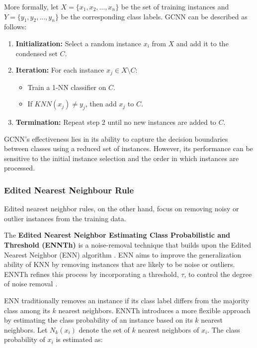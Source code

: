 More formally, let $X = \{x_1, x_2, ..., x_n\}$ be the set of training instances and $Y = \{y_1, y_2, ..., y_n\}$ be 
the corresponding class labels. GCNN can be described as follows:

\begin{enumerate}
    \item \textbf{Initialization:} Select a random instance $x_i$ from $X$ and add it to the condensed set $C$.
    \item \textbf{Iteration:} For each instance $x_j \in X \setminus C$:
    \begin{itemize}
        \item Train a 1-NN classifier on $C$.
        \item If $KNN(x_j) \neq y_j$, then add $x_j$ to $C$.
    \end{itemize}
    \item \textbf{Termination:} Repeat step 2 until no new instances are added to $C$.
\end{enumerate}

GCNN's effectiveness lies in its ability to capture the decision boundaries between classes using a reduced 
set of instances. However, its performance can be sensitive to the initial instance selection and the order 
in which instances are processed.



\subsubsection*{Edited Nearest Neighbour Rule}
Edited nearest neighbor rules, on the other hand, focus on removing noisy or outlier 
instances from the training data. 

The \textbf{Edited Nearest Neighbor Estimating Class Probabilistic and Threshold (ENNTh)} is a noise-removal
technique that builds upon the Edited Nearest Neighbor (ENN) algorithm \cite{Wilson2000,ENNTH}.
ENN aims to improve the generalization ability of KNN by removing instances that are likely to be noise or outliers.
ENNTh refines this process by incorporating a threshold, $\tau$, to control the degree of noise removal \cite{ENNTH}.

ENN traditionally removes an instance if its class label differs from the majority class among its $k$ nearest neighbors. ENNTh introduces a more flexible approach by estimating the class probability of an instance based on its $k$ nearest neighbors. Let $N_k(x_i)$ denote the set of $k$ nearest neighbors of $x_i$. The class probability of $x_i$ is estimated as:

